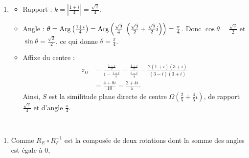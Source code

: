 \begin{description}
\begin{description}
\begin{enumerate}
\begin{enumerate}
\begin{align*}
                                      & = \frac{\frac{i}{2} \cdot (1-i)}{(1+i)\; (1-i)}   
                                        = \frac{i + 1}{2 (1 + 1)}          
                                        = \frac{1}{4} + \frac{1}{4} i .
                                 \end{align*}
                                 Donc $b = z_J - a z_A = \frac{1}{2} + \frac{1}{2} i $.
                                 Ainsi, 
                                 .
									\item {}
										\begin{itemize}
											\item Rapport : $k = \left| \frac{1+i}{4} \right| = \frac{\sqrt{2}}{4}$.
											\item Angle : 
												$\theta 
													= \mathrm{Arg}\left( \frac{1+i}{4} \right) 
													= \mathrm{Arg}\left( \frac{\sqrt{2}}{4} \; \left( \frac{\sqrt{2}}{2} + \frac{\sqrt{2}}{2} i \right) \right)
													= \frac{\pi}{4}$.
												Donc $\cos \theta = \frac{\sqrt{2}}{2}$ et $\sin \theta = \frac{\sqrt{2}}{2}$,
												ce qui donne $\theta = \frac{\pi}{4}$.
											\item Affixe du centre : 
												\begin{align*}
													z_\Omega 	& = \frac{\frac{1+i}{2}}{1-\frac{1+i}{4}}		
																  = \frac{\frac{1+i}{2}}{\frac{3-i}{4}}			
																  = \frac{2(1+i)(3+i)}{(3-i)(3+i)}				\\
																& = \frac{4+8i}{10}									
																  = \frac{2+4i}{5} .
												\end{align*}
											Ainsi, $S$ est la similitude plane directe de centre
											$\Omega\left(\frac{2}{5}+\frac{4}{5}i\right)$,
											de rapport $\frac{\sqrt{2}}{4}$ et d'angle $\frac{\pi}{4}$.
										\end{itemize}
                        \end{enumerate}
                  \end{enumerate}
         \end{description}
	\item[Partie B]~\newline
		\begin{enumerate}
			\item {}
					Comme $R_E \circ R_F^{-1}$ est la compos\'ee de deux rotations dont la somme des angles est \'egale \`a $0$,

\end{enumerate}
\end{description}
